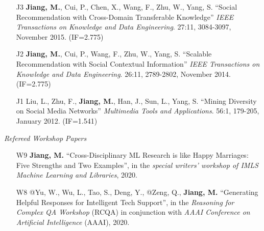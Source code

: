 \documentclass[10pt]{article}
\newenvironment{myindentpar}[1]%
{\begin{list}{}%
         {\setlength{\leftmargin}{#1}}%
         \item[]%
}
{\end{list}}
\newcounter{list}
\newcommand{\hide}[1]{}
\begin{document}
\begin{myindentpar}{0.00cm}
\begin{enumerate}[leftmargin=.5cm]
\item[J3] \textbf{Jiang, M.}, Cui, P., Chen, X., Wang, F., Zhu, W., Yang, S. ``Social Recommendation with Cross-Domain Transferable Knowledge'' \textit{IEEE Transactions on Knowledge and Data Engineering}. 27:11, 3084-3097, November 2015. (IF=2.775)

	\hide{\vspace{-0.1cm}\hspace{0.5cm}{\small \emph{I conceived the idea in consultation with Dr. Cui. I designed the study, completed the experiments, and wrote the paper. Mr. Chen helped the experiments.}}}

\item[J2] \textbf{Jiang, M.}, Cui, P., Wang, F., Zhu, W., Yang, S. ``Scalable Recommendation with Social Contextual Information'' \textit{IEEE Transactions on Knowledge and Data Engineering}. 26:11, 2789-2802, November 2014. (IF=2.775)

	\hide{\vspace{-0.1cm}\hspace{0.5cm}{\small \emph{I conceived the idea in consultation with Dr. Cui. I designed the study, completed the experiments, and wrote the paper. Dr. Cui edited the paper.}}}

\item[J1] Liu, L., Zhu, F., \textbf{Jiang, M.}, Han, J., Sun, L., Yang, S. ``Mining Diversity on Social Media Networks'' \textit{Multimedia Tools and Applications}. 56:1, 179-205, January 2012. (IF=1.541)

	\hide{\vspace{-0.1cm}\hspace{0.5cm}{\small \emph{Ms. Liu conceived the idea in consultation with myself. Ms. Liu, her colleague Dr. Zhu, and I implemented the system and completed the experiments.}}}

\end{enumerate}

\hspace{-0.25cm}\emph{Refereed Workshop Papers}

\begin{enumerate}[leftmargin=.5cm]

\item[W9] \textbf{Jiang, M.} ``Cross-Disciplinary ML Research is like Happy Marriages: Five Strengths and Two Examples'', in the \textit{special writers' workshop of IMLS Machine Learning and Libraries}, 2020.

\item[W8] @Yu, W., Wu, L., Tao, S., Deng, Y., @Zeng, Q., \textbf{Jiang, M.} ``Generating Helpful Responses for Intelligent Tech Support'', in the \textit{Reasoning for Complex QA  Workshop} (RCQA) in conjunction with \textit{AAAI Conference on Artificial Intelligence} (AAAI), 2020.


\end{enumerate}
\end{myindentpar}
\end{document}
